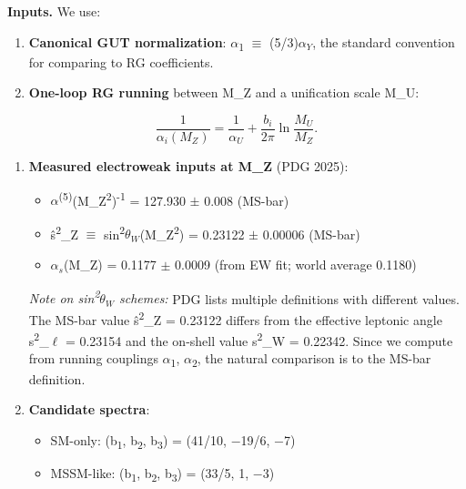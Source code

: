 \documentclass[11pt,a4paper]{article}
\theoremstyle{remark}
\providecommand{\tightlist}{%
  \setlength{\itemsep}{0pt}\setlength{\parskip}{0pt}}
\begin{document}
\textbf{Inputs.} We use:

\begin{enumerate}
\def\labelenumi{\arabic{enumi}.}
\item
  \textbf{Canonical GUT normalization}: \ensuremath{\alpha}\textsubscript{1} \ensuremath{\equiv} (5/3)$\alpha_Y$, the
  standard convention for comparing to RG coefficients.
\item
  \textbf{One-loop RG running} between M\_Z and a unification scale M\_U:
\end{enumerate}

\[
   \frac{1}{\alpha_i(M_Z)} = \frac{1}{\alpha_U} + \frac{b_i}{2\pi}
   \ln\frac{M_U}{M_Z}.
\]

\begin{enumerate}
\def\labelenumi{\arabic{enumi}.}
\setcounter{enumi}{2}
\item
  \textbf{Measured electroweak inputs at M\_Z} (PDG 2025):

  \begin{itemize}
  \tightlist
  \item
    \ensuremath{\alpha}\textsuperscript{(5)}(M\_Z\textsuperscript{2})\textsuperscript{-1} = 127.930 \ensuremath{\pm} 0.008 (MS-bar)
  \item
    \^{s}\textsuperscript{2}\_Z \ensuremath{\equiv} sin\textsuperscript{2}$\theta_W$(M\_Z\textsuperscript{2}) = 0.23122 \ensuremath{\pm} 0.00006 (MS-bar)
  \item
    $\alpha_s$(M\_Z) = 0.1177 \ensuremath{\pm} 0.0009 (from EW fit; world average 0.1180)
  \end{itemize}

  \emph{Note on sin\textsuperscript{2}$\theta_W$ schemes:} PDG lists multiple definitions with different values.
  The MS-bar value \^{s}\textsuperscript{2}\_Z = 0.23122 differs from the effective leptonic angle
  s\textsuperscript{2}\_\ensuremath{\ell} = 0.23154 and the on-shell value s\textsuperscript{2}\_W = 0.22342. Since we compute from
  running couplings \ensuremath{\alpha}\textsubscript{1}, \ensuremath{\alpha}\textsubscript{2}, the natural comparison is to the MS-bar definition.
\item
  \textbf{Candidate spectra}:

  \begin{itemize}
  \tightlist
  \item
    SM-only: (b\textsubscript{1}, b\textsubscript{2}, b\textsubscript{3}) = (41/10, \ensuremath{-}19/6, \ensuremath{-}7)
  \item
    MSSM-like: (b\textsubscript{1}, b\textsubscript{2}, b\textsubscript{3}) = (33/5, 1, \ensuremath{-}3)
  \end{itemize}
\end{enumerate}
\end{document}
